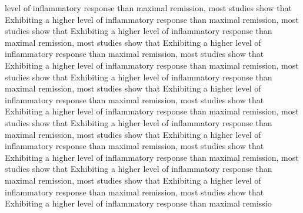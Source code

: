 \documentclass{article}
\begin{document}
level of inflammatory response than maximal remission, most studies show that Exhibiting a higher level of inflammatory response than maximal remission, most studies show that Exhibiting a higher level of inflammatory response than maximal remission, most studies show that Exhibiting a higher level of inflammatory response than maximal remission, most studies show that Exhibiting a higher level of inflammatory response than maximal remission, most studies show that Exhibiting a higher level of inflammatory response than maximal remission, most studies show that Exhibiting a higher level of inflammatory response than maximal remission, most studies show that Exhibiting a higher level of inflammatory response than maximal remission, most studies show that Exhibiting a higher level of inflammatory response than maximal remission, most studies show that Exhibiting a higher level of inflammatory response than maximal remission, most studies show that Exhibiting a higher level of inflammatory response than maximal remission, most studies show that Exhibiting a higher level of inflammatory response than maximal remission, most studies show that Exhibiting a higher level of inflammatory response than maximal remission, most studies show that Exhibiting a higher level of inflammatory response than maximal remissio
\end{document}
